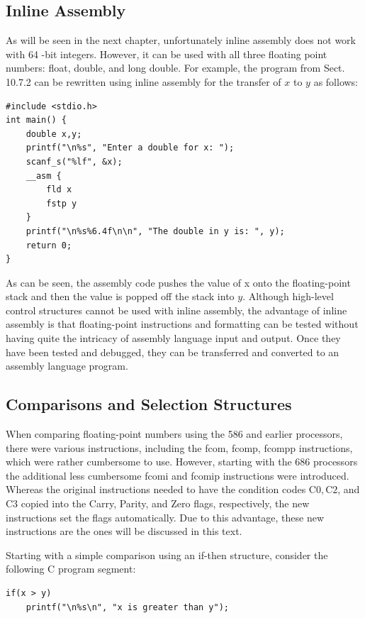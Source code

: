 \documentclass[10pt]{book}
\begin{document}
\subsection{Inline Assembly}
As will be seen in the next chapter, unfortunately inline assembly does not work with 64 -bit integers. However, it can be used with all three floating point numbers: float, double, and long double. For example, the program from Sect. 10.7.2 can be rewritten using inline assembly for the transfer of $x$ to $y$ as follows:

\begin{verbatim}
#include <stdio.h>
int main() {
    double x,y;
    printf("\n%s", "Enter a double for x: ");
    scanf_s("%lf", &x);
    __asm {
        fld x
        fstp y
    }
    printf("\n%s%6.4f\n\n", "The double in y is: ", y);
    return 0;
}
\end{verbatim}

As can be seen, the assembly code pushes the value of x onto the floating-point stack and then the value is popped off the stack into $y$. Although high-level control structures cannot be used with inline assembly, the advantage of inline assembly is that floating-point instructions and formatting can be tested without having quite the intricacy of assembly language input and output. Once they have been tested and debugged, they can be transferred and converted to an assembly language program.
\subsection{Comparisons and Selection Structures}
When comparing floating-point numbers using the 586 and earlier processors, there were various instructions, including the fcom, fcomp, fcompp instructions, which were rather cumbersome to use. However, starting with the 686 processors the additional less cumbersome fcomi and fcomip instructions were introduced. Whereas the original instructions needed to have the condition codes $\mathrm{C} 0, \mathrm{C} 2$, and C3 copied into the Carry, Parity, and Zero flags, respectively, the new instructions set the flags automatically. Due to this advantage, these new instructions are the ones will be discussed in this text.

Starting with a simple comparison using an if-then structure, consider the following C program segment:

\begin{verbatim}
if(x > y)
    printf("\n%s\n", "x is greater than y");
\end{verbatim}
\end{document}
